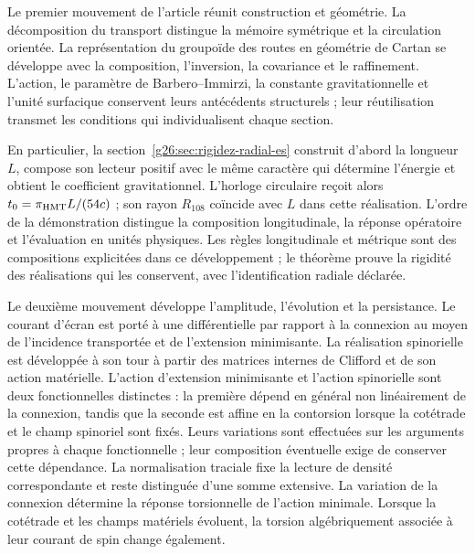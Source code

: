 Le premier mouvement de l'article réunit construction et géométrie. La
décomposition du transport distingue la mémoire symétrique et la circulation
orientée. La représentation du groupoïde des routes en géométrie de Cartan
se développe avec la composition, l'inversion, la covariance et le raffinement.
L'action, le paramètre de Barbero--Immirzi, la constante gravitationnelle et
l'unité surfacique conservent leurs antécédents structurels ; leur réutilisation
transmet les conditions qui individualisent chaque section.

En particulier, la section~\ref{g26:sec:rigidez-radial-es} construit
d'abord la longueur \(L\), compose son lecteur positif avec le même
caractère qui détermine l'énergie et obtient le coefficient gravitationnel.
L'horloge circulaire reçoit alors
\(t_0=\pi_{\rm HMT}L/(54c)\) ; son rayon \(R_{108}\) coïncide avec
\(L\) dans cette réalisation. L'ordre de la démonstration distingue la
composition longitudinale, la réponse opératoire et l'évaluation en
unités physiques. Les règles longitudinale et métrique sont des compositions
explicitées dans ce développement ; le théorème prouve la rigidité des
réalisations qui les conservent, avec l'identification radiale déclarée.

Le deuxième mouvement développe l'amplitude, l'évolution et la persistance. Le courant d'écran est porté à une différentielle par rapport à la connexion au moyen de l'incidence transportée et de l'extension minimisante. La réalisation spinorielle est développée à son tour à partir des matrices internes de Clifford et de son action matérielle. L'action d'extension minimisante et l'action spinorielle sont deux fonctionnelles distinctes : la première dépend en général non linéairement de la connexion, tandis que la seconde est affine en la contorsion lorsque la cotétrade et le champ spinoriel sont fixés. Leurs variations sont effectuées sur les arguments propres à chaque fonctionnelle ; leur composition éventuelle exige de conserver cette dépendance. La normalisation traciale fixe la lecture de densité correspondante et reste distinguée d'une somme extensive. La variation de la connexion détermine la réponse torsionnelle de l'action minimale. Lorsque la cotétrade et les champs matériels évoluent, la torsion algébriquement associée à leur courant de spin change également.

